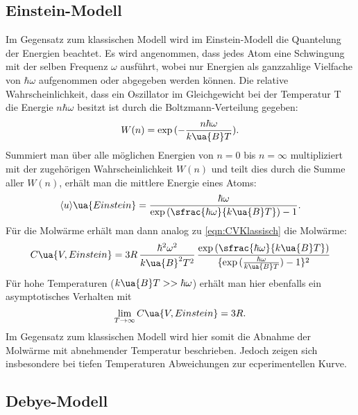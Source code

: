 \subsection{Einstein-Modell}

Im Gegensatz zum klassischen Modell wird im Einstein-Modell die Quantelung der Energien
beachtet. Es wird angenommen, dass jedes Atom eine Schwingung mit der selben Frequenz
$\omega$ ausführt, wobei nur Energien als ganzzahlige Vielfache von $\hbar\omega$
aufgenommen oder abgegeben werden können. Die relative Wahrscheinlichkeit, dass ein
Oszillator im Gleichgewicht bei der Temperatur T die Energie $n\hbar\omega$ besitzt
ist durch die Boltzmann-Verteilung gegeben:
\begin{equation}
  W(n) = \exp {(-\frac{n\hbar\omega}{k\ua{B}T})}.
\end{equation}
Summiert man über alle möglichen Energien von $n=0$ bis $n=\infty$ multipliziert
mit der zugehörigen Wahrscheinlichkeit $W(n)$ und teilt dies durch die Summe aller
$W(n)$, erhält man die mittlere Energie eines Atoms:
\begin{equation}
  \langle u \rangle\ua{Einstein} = \frac{\hbar\omega}{\exp{(\sfrac{\hbar\omega}{k\ua{B}T})-1}}.
\end{equation}
Für die Molwärme erhält man dann analog zu \eqref{eqn:CVKlassisch} die Molwärme:
\begin{equation}
  C\ua{V, Einstein} = 3R \,\frac{\hbar^2\omega^2}{k\ua{B}^2T^2} \,\frac{\exp{(\sfrac{\hbar\omega}{k\ua{B}T})}}{\{\exp{(\frac{\hbar\omega}{k\ua{B}T})}-1\}^2}
\end{equation}
Für hohe Temperaturen ($k\ua{B}T>>\hbar\omega$) erhält man hier ebenfalls ein
asymptotisches Verhalten mit
\begin{equation}
  \lim\limits_{T \rightarrow \infty}{C\ua{V,Einstein}} = 3R.
\end{equation}
Im Gegensatz zum klassischen Modell wird hier somit die Abnahme der Molwärme mit
abnehmender Temperatur beschrieben. Jedoch zeigen sich insbesondere bei tiefen
Temperaturen Abweichungen zur ecperimentellen Kurve.

\subsection{Debye-Modell}

